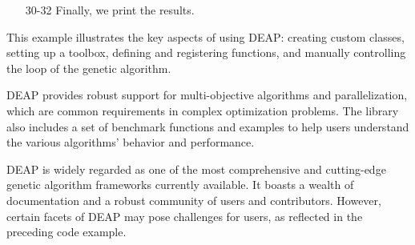 \begin{enumerate}
      \begin{enumerate}
        \item[21-22] We apply crossover and mutation to the population using the
          \texttt{varAnd} function,\footnote{This function simply applies the
          variation operators to the population.} and then evaluate the fitness
          of the offspring
        \item[23-24] We assign the newly computed fitness values to the
          individuals.
        \item[25] We replace the old population with the selected individuals
          from the offspring.
        \item[26-27] We update the Hall of Fame and compile the statistics.
        \item[28-29] We check if the maximum fitness has reached the target
          fitness.
          If it has, we break the loop and the algorithm stops.
      \end{enumerate}

    \item[30-32] Finally, we print the results.
  \end{enumerate}

  This example illustrates the key aspects of using DEAP: creating custom
  classes, setting up a toolbox, defining and registering functions, and
  manually controlling the loop of the genetic algorithm.

  DEAP provides robust support for multi-objective algorithms and
  parallelization, which are common requirements in complex optimization
  problems.
  The library also includes a set of benchmark functions and examples to help
  users understand the various algorithms' behavior and performance.

  DEAP is widely regarded as one of the most comprehensive and cutting-edge
  genetic algorithm frameworks currently available.
  It boasts a wealth of documentation and a robust community of users and
  contributors.
  However, certain facets of DEAP may pose challenges for users, as reflected in
  the preceding code example.

